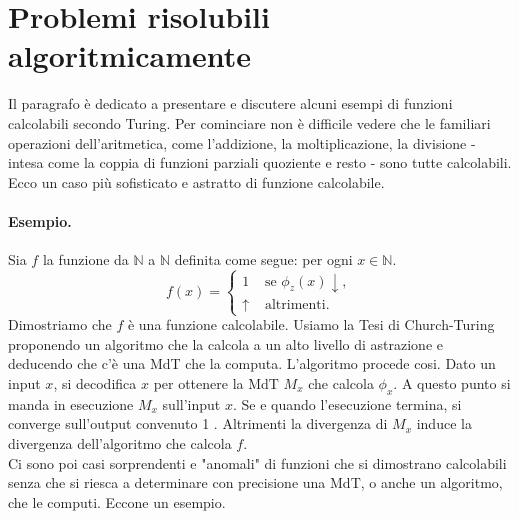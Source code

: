 \section{Problemi risolubili algoritmicamente}

Il paragrafo è dedicato a presentare e discutere alcuni esempi di
funzioni calcolabili secondo Turing. Per cominciare non è difficile vedere che le
familiari operazioni dell'aritmetica, come l'addizione, la moltiplicazione, la
divisione - intesa come la coppia di funzioni parziali quoziente e resto - sono tutte
calcolabili. Ecco un caso più sofisticato e astratto di funzione calcolabile.

\paragraph{Esempio.}
Sia $f$ la funzione da $\mathbb{N}$ a $\mathbb{N}$ definita come segue: per ogni $x
    \in \mathbb{N}$.
$$
    f(x)= \begin{cases}1 & \text { se } \phi_z(x) \downarrow, \\ \uparrow & \text { altrimenti. }\end{cases}
$$
Dimostriamo che $f$ è una funzione calcolabile. Usiamo la Tesi di Church-Turing
proponendo un algoritmo che la calcola a un alto livello di astrazione e deducendo
che c'è una MdT che la computa. L'algoritmo procede cosi. Dato un input $x$, si
decodifica $x$ per ottenere la MdT $M_x$ che calcola $\phi_x$. A questo punto si
manda in esecuzione $M_x$ sull'input $x$. Se e quando l'esecuzione termina, si
converge sull'output convenuto 1 . Altrimenti la divergenza di $M_x$ induce la
divergenza dell'algoritmo che calcola $f$.\\
Ci sono poi casi sorprendenti e "anomali"
di funzioni che si dimostrano calcolabili senza che si riesca a determinare con
precisione una MdT, o anche un algoritmo, che le computi. Eccone un esempio.


